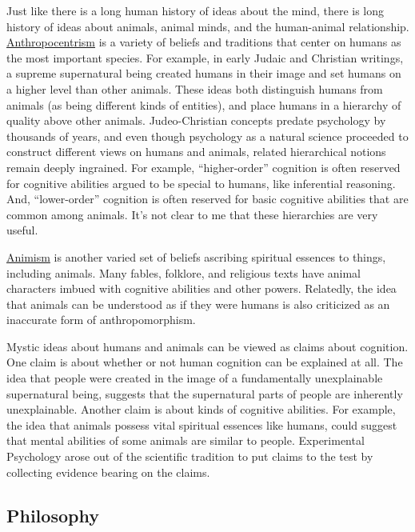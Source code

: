 \documentclass[
  oneside,
  12pt]{crumpbook}
\begin{document}
Just like there is a long human history of ideas about the mind, there is long history of ideas about animals, animal minds, and the human-animal relationship. \href{https://en.wikipedia.org/wiki/Anthropocentrism}{Anthropocentrism} is a variety of beliefs and traditions that center on humans as the most important species. For example, in early Judaic and Christian writings, a supreme supernatural being created humans in their image and set humans on a higher level than other animals. These ideas both distinguish humans from animals (as being different kinds of entities), and place humans in a hierarchy of quality above other animals. Judeo-Christian concepts predate psychology by thousands of years, and even though psychology as a natural science proceeded to construct different views on humans and animals, related hierarchical notions remain deeply ingrained. For example, ``higher-order'' cognition is often reserved for cognitive abilities argued to be special to humans, like inferential reasoning. And, ``lower-order'' cognition is often reserved for basic cognitive abilities that are common among animals. It's not clear to me that these hierarchies are very useful.

\href{https://en.wikipedia.org/wiki/Animism}{Animism} is another varied set of beliefs ascribing spiritual essences to things, including animals. Many fables, folklore, and religious texts have animal characters imbued with cognitive abilities and other powers. Relatedly, the idea that animals can be understood as if they were humans is also criticized as an inaccurate form of anthropomorphism.

Mystic ideas about humans and animals can be viewed as claims about cognition. One claim is about whether or not human cognition can be explained at all. The idea that people were created in the image of a fundamentally unexplainable supernatural being, suggests that the supernatural parts of people are inherently unexplainable. Another claim is about kinds of cognitive abilities. For example, the idea that animals possess vital spiritual essences like humans, could suggest that mental abilities of some animals are similar to people. Experimental Psychology arose out of the scientific tradition to put claims to the test by collecting evidence bearing on the claims.

\hypertarget{philosophy}{%
\subsection{Philosophy}\label{philosophy}}
\end{document}
